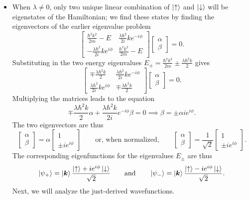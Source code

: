 \documentclass[11pt, a4paper]{article}
\newcommand{\eqtext}[1]{\qquad \text{#1} \qquad}
\renewcommand{\vec}[1]{\bm{#1}} %
\newcommand{\ua}{\uparrow}  %
\newcommand{\da}{\downarrow}  %
\renewcommand{\k}{\vec{k}}  %
\begin{document}
\begin{itemize}
	\item When $ \lambda \neq 0 $, only two unique linear combination of $ \ket{\ua} $ and $ \ket{\da} $ will be eigenstates of the Hamiltonian; we find these states by finding the eigenvectors of the earlier eigenvalue problem
	\begin{equation*}
		\begin{bmatrix}
		\frac{\hbar^{2}k^{2}}{2m} - E & \frac{\lambda \hbar^{2}}{2i}ke^{-i\phi} \\[1mm]
		-\frac{\lambda \hbar^{2}}{2i}ke^{i\phi} & \frac{\hbar^{2}k^{2}}{2m} - E
		\end{bmatrix}
		\begin{bmatrix}
			\alpha\\
			\beta
		\end{bmatrix}
		= 0.
	\end{equation*}
	Substituting in the two energy eigenvalues $ E_{\pm} = \frac{\hbar^{2}k^{2}}{2m} \pm \frac{\lambda \hbar^{2}k}{2} $ gives
	\begin{equation*}
		\begin{bmatrix}
		\mp \frac{\lambda \hbar^{2}k}{2}  & \frac{\lambda \hbar^{2}}{2i}ke^{-i\phi} \\[1mm]
		\frac{\lambda \hbar^{2}}{2i}ke^{i\phi} & \mp \frac{\lambda \hbar^{2}k}{2} 
		\end{bmatrix}
		\begin{bmatrix}
			\alpha\\
			\beta
		\end{bmatrix}
		= 0.
	\end{equation*}
	Multiplying the matrices leads to the equation
	\begin{equation*}
		\mp \frac{\lambda \hbar^{2}k}{2}\alpha + \frac{\lambda \hbar^{2}k}{2i} e^{-i\phi} \beta = 0 \implies \beta = \pm \alpha i e^{i\phi}.
	\end{equation*}
	The two eigenvectors are thus
	\begin{equation*}
		\begin{bmatrix}
			\alpha\\
			\beta
		\end{bmatrix}
		= 
		\alpha 
		\begin{bmatrix}
			1 \\
			\pm ie^{i\phi}
		\end{bmatrix}
		\eqtext{or, when normalized,}
		\begin{bmatrix}
			\alpha\\
			\beta
		\end{bmatrix}
		= 
		\frac{1}{\sqrt{2}} 
		\begin{bmatrix}
			1 \\
			\pm ie^{i\phi}
		\end{bmatrix}.
	\end{equation*}
	The corresponding eigenfunctions for the eigenvalues $ E_{\pm} $ are thus
	\begin{equation*}
		\ket{\psi_{+}} = \ket{\k}\frac{\ket{\ua} + ie^{i\phi}\ket{\da}}{\sqrt{2}} \eqtext{and} \ket{\psi_{-}} =  \ket{\k}\frac{\ket{\ua} - ie^{i\phi}\ket{\da}}{\sqrt{2}}.
	\end{equation*}
	Next, we will analyze the just-derived wavefunctions.
\end{itemize}
\end{document}
